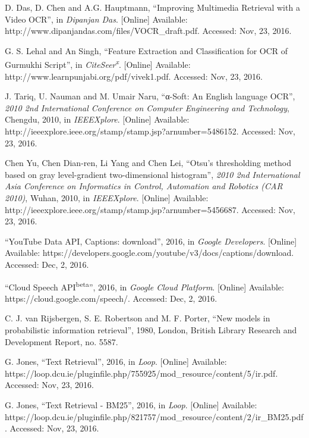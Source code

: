 \documentclass[a4paper,12pt]{article}
\begin{document}
\begin{thebibliography}{9}

    D. Das,
    D. Chen
    and A.G. Hauptmann,
    ``Improving Multimedia Retrieval with a Video OCR'',
    in \emph{Dipanjan Das}.
    [Online]
    Available: http://www.dipanjandas.com/files/VOCR\_draft.pdf.
    Accessed: Nov, 23, 2016.

    G. S. Lehal
    and An Singh,
    ``Feature Extraction and Classification for OCR of Gurmukhi Script'',
    in \emph{CiteSeer\textsuperscript{x}}.
    [Online]
    Available: http://www.learnpunjabi.org/pdf/vivek1.pdf.
    Accessed: Nov, 23, 2016.

    J. Tariq,
    U. Nauman
    and M. Umair Naru,
    ``α-Soft: An English language OCR'',
    \emph{2010 2nd International Conference on Computer Engineering and Technology},
    Chengdu,
    2010,
    in \emph{IEEEXplore\textregistered}.
    [Online]
    Available: http://ieeexplore.ieee.org/stamp/stamp.jsp?arnumber=5486152.
    Accessed: Nov, 23, 2016.

    Chen Yu,
    Chen Dian-ren,
    Li Yang
    and Chen Lei,
    ``Otsu's thresholding method based on gray level-gradient two-dimensional histogram'',
    \emph{2010 2nd International Asia Conference on Informatics in Control, Automation and Robotics (CAR 2010)},
    Wuhan,
    2010,
    in \emph{IEEEXplore\textregistered}.
    [Online]
    Available: http://ieeexplore.ieee.org/stamp/stamp.jsp?arnumber=5456687.
    Accessed: Nov, 23, 2016.

    ``YouTube Data API, Captions: download'',
    2016,
    in \emph{Google Developers}.
    [Online]
    Available: https://developers.google.com/youtube/v3/docs/captions/download.
    Accessed: Dec, 2, 2016.

    ``Cloud Speech API\textsuperscript{beta}'',
    2016,
    in \emph{Google Cloud Platform}.
    [Online]
    Available: https://cloud.google.com/speech/.
    Accessed: Dec, 2, 2016.

    C. J. van Rijsbergen,
    S. E. Robertson
    and M. F. Porter,
    ``New models in probabilistic information retrieval'',
    1980,
    London,
    British Library Research and Development Report, no. 5587.

    G. Jones,
    ``Text Retrieval'',
    2016,
    in \emph{Loop}.
    [Online]
    Available: https://loop.dcu.ie/pluginfile.php/755925/mod\_resource/content/5/ir.pdf.
    Accessed: Nov, 23, 2016.

    G. Jones,
    ``Text Retrieval - BM25'',
    2016,
    in \emph{Loop}.
    [Online]
    Available: https://loop.dcu.ie/pluginfile.php/821757/mod\_resource/content/2/ir\_BM25.pdf.
    Accessed: Nov, 23, 2016.



\end{thebibliography}
\end{document}
